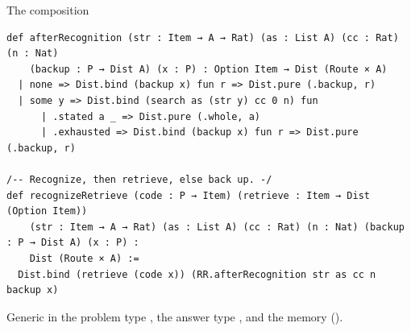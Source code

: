 \documentclass[aspectratio=169,11pt]{beamer}
\begin{document}
\begin{frame}[fragile]{The composition}
\begin{Verbatim}
def afterRecognition (str : Item → A → Rat) (as : List A) (cc : Rat) (n : Nat)
    (backup : P → Dist A) (x : P) : Option Item → Dist (Route × A)
  | none => Dist.bind (backup x) fun r => Dist.pure (.backup, r)
  | some y => Dist.bind (search as (str y) cc 0 n) fun
      | .stated a _ => Dist.pure (.whole, a)
      | .exhausted => Dist.bind (backup x) fun r => Dist.pure (.backup, r)

/-- Recognize, then retrieve, else back up. -/
def recognizeRetrieve (code : P → Item) (retrieve : Item → Dist (Option Item))
    (str : Item → A → Rat) (as : List A) (cc : Rat) (n : Nat) (backup : P → Dist A) (x : P) :
    Dist (Route × A) :=
  Dist.bind (retrieve (code x)) (RR.afterRecognition str as cc n backup x)
\end{Verbatim}
  \medskip
  Generic in the problem type , the answer type , and the memory ().
\end{frame}
\end{document}
